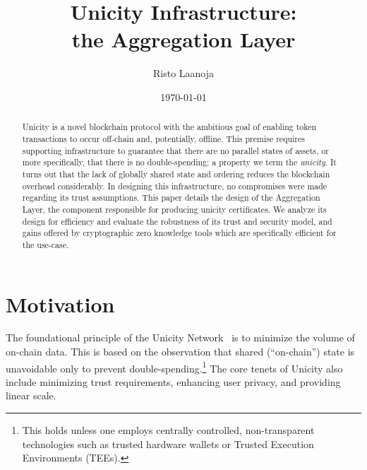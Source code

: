 \documentclass[twocolumn]{article}
\title{Unicity Infrastructure:\\
    the Aggregation Layer}
\author[1]{Risto Laanoja}
\affil[1]{Unicity Labs}
\date{\today}
\begin{document}
\maketitle

\begin{abstract}
Unicity is a novel blockchain protocol with the ambitious goal of enabling token transactions to occur off-chain and, potentially, offline. This premise requires supporting infrastructure to guarantee that there are no parallel states of assets, or more specifically, that there is no double-spending; a property we term the \textit{unicity}. It turns out that the lack of globally shared state and ordering reduces the blockchain overhead considerably. In designing this infrastructure, no compromises were made regarding its trust assumptions. This paper details the design of the Aggregation Layer, the component responsible for producing unicity certificates. We analyze its design for efficiency and evaluate the robustness of its trust and security model, and gains offered by cryptographic zero knowledge tools which are specifically efficient for the use-case.
\end{abstract}


\section{Motivation}

The foundational principle of the Unicity Network~\cite{wp} is to minimize the volume of on-chain data. This is based on the observation that shared (``on-chain'') state is unavoidable only to prevent double-spending.\footnote{This holds unless one employs centrally controlled, non-transparent technologies such as trusted hardware wallets or Trusted Execution Environments (TEEs).} The core tenets of Unicity also include minimizing trust requirements, enhancing user privacy, and providing linear scale.

\end{document}

